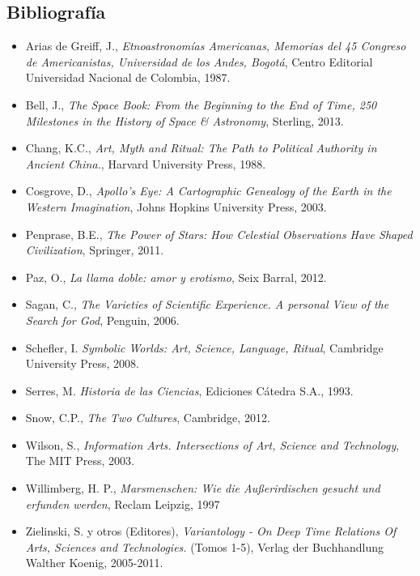 \documentclass[12pt]{report}
\begin{document}
\subsection*{Bibliograf\'ia}

\begin{itemize}

\item Arias de Greiff, J., \emph{Etnoastronom\'ias Americanas, Memorias
del 45 Congreso de Americanistas, Universidad de los Andes, Bogot\'a},
  Centro Editorial Universidad Nacional de Colombia, 1987.

\item Bell, J., \emph{The Space Book: From the Beginning to the End of Time, 250
  Milestones in the History of Space \& Astronomy}, Sterling, 2013.

\item Chang, K.C., \emph{Art, Myth and Ritual: The Path to Political
  Authority in Ancient China.}, Harvard University Press, 1988.

\item Cosgrove, D., \emph{Apollo's Eye: A Cartographic Genealogy of
  the Earth in the Western Imagination}, Johns Hopkins University
  Press, 2003.

\item Penprase, B.E., \emph{The Power of Stars: How Celestial
  Observations Have Shaped Civilization}, Springer, 2011.

\item Paz, O., \emph{La llama doble: amor y erotismo}, Seix Barral, 2012.

\item Sagan, C., \emph{The Varieties of Scientific Experience. A personal View of the Search for God}, Penguin, 2006.

\item Schefler, I. \emph{Symbolic Worlds: Art, Science, Language,
  Ritual}, Cambridge University Press, 2008.

\item Serres, M. \emph{Historia de las Ciencias}, Ediciones C\'atedra
  S.A., 1993. 

\item Snow, C.P., \emph{The Two Cultures}, Cambridge, 2012.

\item Wilson, S., \emph{Information Arts. Intersections of Art, Science
and Technology}, The MIT Press, 2003.

\item Willimberg, H. P., \emph{Marsmenschen:  Wie die Au\ss erirdischen
  gesucht und erfunden werden}, Reclam Leipzig, 1997

\item Zielinski, S. y otros (Editores), \emph{Variantology - On Deep Time
  Relations Of Arts, Sciences and Technologies.} (Tomos 1-5), Verlag
der Buchhandlung Walther Koenig, 2005-2011.  

\end{itemize}
\end{document}
